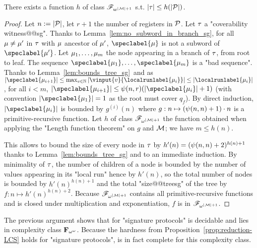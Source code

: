 \begin{proposition}
\label{prop:bounded_witness_sg}
There exists a function $h$ of class $\mathscr{F}_{w^{|\mathcal{M}|+1}}$ s.t. $|\tau| \leq h(|\mathcal{P}|)$. 
\end{proposition}
\begin{proof}
Let $n := |\mathcal{P}|$, let $r+1$ the number of registers in $\mathcal{P}$. 
Let $\tau$ a "coverability witness@@sg". Thanks to Lemma~\ref{lem:no_subword_in_branch_sg}, for all $\mu \ne \mu'$ in 
$\tau$ with $\mu$ ancestor of $\mu'$, $\speclabel{\node}$ is not a subword of $\speclabel{\node'}$.  Let $\mu_1, \dots, \mu_m$ the node appearing in a branch of $\tau$, from root to leaf. The sequence $\speclabel{\node_1}, \dots, \speclabel{\node_m}$ is a "bad sequence".
Thanks to Lemma~\ref{lem:bounds_tree_sg}\ and as $\size{\speclabel{\node_{i+1}}} \leq \max_{v \in \nats} \size{\vinput{v}{\localrunlabel{\node_i}}} \leq \size{\localrunlabel{\node_i}}$, for all $i<m$, $\size{\speclabel{\node_{i+1}}} \leq \towerfun(n,r) (\size{\speclabel{\node_{i}}} +1)$ (with convention $\size{\speclabel{\node_1}} = 1$ as the root must cover $q_f$). By direct induction, $\size{\speclabel{\node_i}}$ is bounded by $g^{(i)}(n)$ where $g: n \mapsto (\psi(n,n)+1) \cdot n$ is a primitive-recursive function. Let $h$ of class $\mathscr{F}_{\omega^{|\mathcal{M}|+1}}$ the function obtained when applying the "Length function theorem" on $g$ and $\mathcal{M}$; we have $m \leq h(n)$. 

This allows to bound the size of every node in $\tau$ by $h'(n) = (\psi(n,n)+2)^{h(n) + 1}$ thanks to Lemma~\ref{lem:bounds_tree_sg} and to an immediate induction. 
By minimality of $\tau$, the number of children of a node is bounded by the number of values appearing in its "local run" hence by $h'(n)$, so the total number of nodes is bounded by $h'(n)^{h(n)+1}$ and the total "size@@treesg" of the tree by $f:n \mapsto h'(n)^{h(n)+2}$. Because $\mathscr{F}_{\omega^{|\mathcal{M}|+1}}$ contains all primitive-recursive functions and is closed under multiplication and exponentiation, $f$ is in $\mathscr{F}_{\omega^{|\mathcal{M}|+1}}$.
\end{proof}

The previous argument shows that \COVER for "signature protocols" is decidable and lies in complexity class $\mathbf{F}_{\omega^\omega}$. Because the hardness from Proposition~\ref{prop:reduction-LCS} holds for "signature protocols", \COVER is in fact complete for this complexity class.

